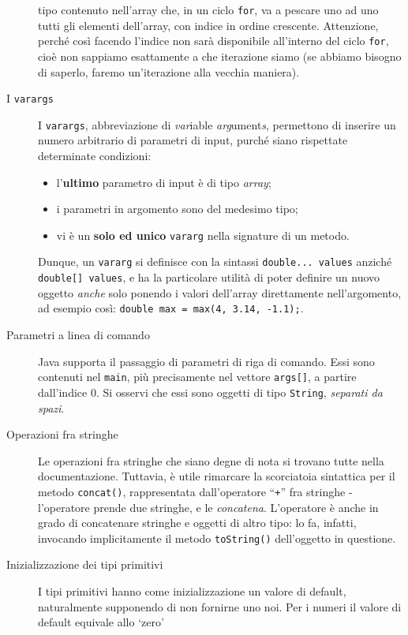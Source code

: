 \documentclass[\fontsizeclass,twocolumn]{\classname}
\theoremstyle{definition}
\theoremstyle{definition}
\begin{document}
\begin{description}
        tipo contenuto nell'array che, in un ciclo \texttt{for}, va a pescare
        uno ad uno tutti gli elementi dell'array, con indice in ordine
        crescente. Attenzione, perché così facendo l'indice non sarà
        disponibile all'interno del ciclo \texttt{for}, cioè non sappiamo
        esattamente a che iterazione siamo (se abbiamo bisogno di saperlo,
        faremo un'iterazione alla vecchia maniera).
    \item[I \texttt{varargs}] I \texttt{varargs}, abbreviazione di
        \emph{var}iable \emph{arg}ument\emph{s}, permettono di inserire un numero arbitrario di parametri di input, purché siano rispettate determinate condizioni:
\begin{itemize}
    \item l'\textbf{ultimo} parametro di input è di tipo \emph{array};
    \item i parametri in argomento sono del medesimo tipo;
    \item vi è un \textbf{solo ed unico} \texttt{vararg} nella signature di un
        metodo.
\end{itemize}
    Dunque, un \texttt{vararg} si definisce con la sintassi \texttt{double...
    values} anziché \texttt{double[] values}, e ha la particolare utilità di
    poter definire un nuovo oggetto \emph{anche} solo ponendo i valori
    dell'array direttamente nell'argomento, ad esempio così: \texttt{double max
    = max(4, 3.14, -1.1);}.
\item[Parametri a linea di comando] Java supporta il passaggio di parametri di
    riga di comando. Essi sono contenuti nel \texttt{main}, più precisamente
    nel vettore \texttt{args[]}, a partire dall'indice 0. Si osservi che essi
    sono oggetti di tipo \texttt{String}, \emph{separati da spazi}.
\item[Operazioni fra stringhe] Le operazioni fra stringhe che siano degne di
    nota si trovano tutte nella documentazione. Tuttavia, è utile rimarcare la
    scorciatoia sintattica per il metodo \texttt{concat()}, rappresentata
    dall'operatore ``\texttt{+}'' fra stringhe \-- l'operatore prende due
    stringhe, e le \emph{concatena}. L'operatore è anche in grado di
    concatenare stringhe e oggetti di altro tipo: lo fa, infatti, invocando
    implicitamente il metodo \texttt{toString()} dell'oggetto in questione.
\item[Inizializzazione dei tipi primitivi] I tipi primitivi hanno come
    inizializzazione un valore di default, naturalmente supponendo di non
    fornirne uno noi. Per i numeri il valore di default equivale allo `zero'

\end{description}
\end{document}
